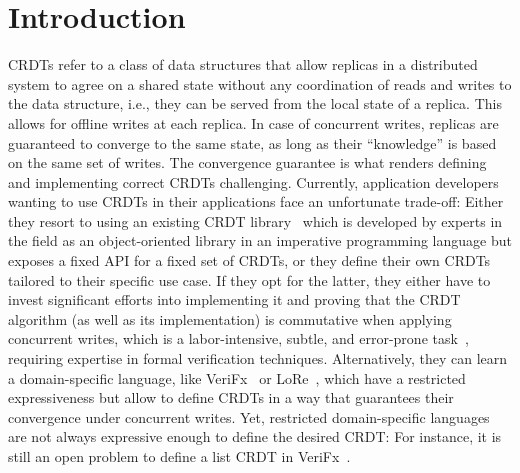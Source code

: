 
\chapter{Introduction}\label{ch:intro}

\acp{CRDT} refer to a class of data structures that allow replicas in a distributed
system to agree on a shared state without any coordination of reads and writes
to the data structure, i.e., they can be served from the local state of a replica.
This allows for offline writes at each replica.
In case of concurrent writes, replicas are guaranteed to converge to the same state,
as long as their ``knowledge'' is based on the same set of writes.
The convergence guarantee is what renders defining and implementing
correct \acp{CRDT} challenging.
Currently, application developers wanting to use \acp{CRDT} in their applications
face an unfortunate trade-off:
Either they resort to using an existing \ac{CRDT} library~\cite{automerge,yjs}
which is developed by experts in the field as an object-oriented library
in an imperative programming language but exposes a fixed API for a fixed
set of \acp{CRDT},
or they define their own \acp{CRDT} tailored to their specific use case.
If they opt for the latter, they either have to invest significant efforts
into implementing it and proving that the \ac{CRDT} algorithm
(as well as its implementation) is commutative when applying concurrent writes,
which is a labor-intensive, subtle, and error-prone
task~\cite{gomes2017verifying,kleppmann2022assessing},
requiring expertise in formal verification techniques.
Alternatively, they can learn a domain-specific language, like VeriFx~\cite{verifx}
or LoRe~\cite{lore}, which have a restricted expressiveness but allow to define
\acp{CRDT} in a way that guarantees their convergence under concurrent writes.
Yet, restricted domain-specific languages are not always expressive enough
to define the desired \ac{CRDT}:
For instance, it is still an open problem to define a list \ac{CRDT} in
VeriFx~\cite{TODO}.

